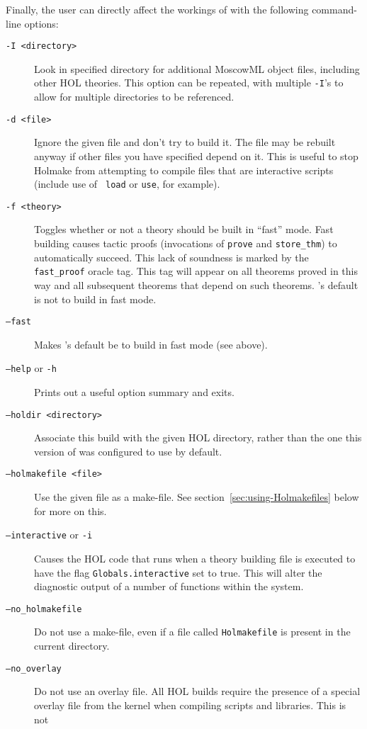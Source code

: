 \noindent Finally, the user can directly affect the workings of \holmake{}
with the following command-line options:
\begin{description}
\item[\tt -I <directory>] Look in specified directory for additional
  MoscowML object files, including other HOL theories.  This option
  can be repeated, with multiple {\tt -I}'s to allow for multiple
  directories to be referenced.
\item[\tt -d <file>] Ignore the given file and don't try to build it.
  The file may be rebuilt anyway if other files you have specified
  depend on it.  This is useful to stop Holmake from attempting to
  compile files that are interactive scripts (include use of {\tt
  load} or {\tt use}, for example).
\item[\texttt{-f <theory>}] Toggles whether or not a theory should be
  built in ``fast'' mode.  Fast building causes tactic proofs
  (invocations of \texttt{prove} and \texttt{store\_thm}) to
  automatically succeed.  This lack of soundness is marked by the
  \texttt{fast\_proof} oracle tag.  This tag will appear on all
  theorems proved in this way and all subsequent theorems that depend
  on such theorems.  \holmake's default is not to build in fast mode.
\item[\texttt{--fast}] Makes \holmake's default be to build in fast
  mode (see above).
\item[{\tt --help} or {\tt -h}] Prints out a useful option summary and
  exits.
\item[\tt --holdir <directory>] Associate this build with the given
  HOL directory, rather than the one this version of \holmake{} was
  configured to use by default.
\item[\tt --holmakefile <file>] Use the given file as a make-file.
  See section~\ref{sec:using-Holmakefiles} below for more on this.
\item[\texttt{--interactive} or \texttt{-i}] Causes the HOL code that
  runs when a theory building file is executed to have the flag
  \texttt{Globals.interactive} set to true.  This will alter the diagnostic
  output of a number of functions within the system.
\item[\texttt{--no\_holmakefile}]  Do not use a make-file, even if a file
  called \texttt{Holmakefile} is present in the current directory.
\item[\texttt{--no\_overlay}] Do not use an overlay file.  All HOL
  builds require the presence of a special overlay file from the
  kernel when compiling scripts and libraries.  This is not

\end{description}
